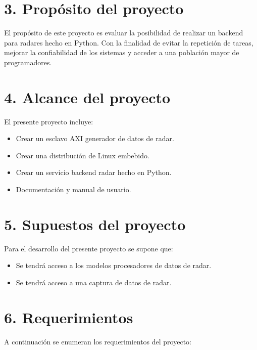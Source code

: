 \documentclass[
11pt, %
]{charter}
\begin{document}
\section{3. Propósito del proyecto}
\label{sec:proposito}

El propósito de este proyecto es evaluar la posibilidad de realizar un backend
para radares hecho en Python. Con la finalidad de evitar la repetición de
tareas, mejorar la confiabilidad de los sistemas y acceder a una población mayor
de programadores.

\newpage

\section{4. Alcance del proyecto}
\label{sec:alcance}

El presente proyecto incluye:

\begin{itemize}
  \item Crear un esclavo AXI generador de datos de radar.
  \item Crear una distribución de Linux embebido.
  \item Crear un servicio backend radar hecho en Python.
  \item Documentación y manual de usuario.
\end{itemize}

\section{5. Supuestos del proyecto}
\label{sec:supuestos}

Para el desarrollo del presente proyecto se supone que:

\begin{itemize}
	\item Se tendrá acceso a los modelos procesadores de datos de radar.
	\item Se tendrá acceso a una captura de datos de radar.
\end{itemize}

\section{6. Requerimientos}
\label{sec:requerimientos}

A continuación se enumeran los requerimientos del proyecto:
\end{document}
